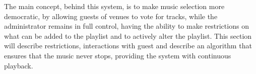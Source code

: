 The main concept, behind this system, is to make music selection more democratic, by allowing guests of venues to vote for tracks, while the administrator remains in full control, having the ability to make restrictions on what can be added to the playlist and to actively alter the playlist. This section will describe restrictions, interactions with guest and describe an algorithm that ensures that the music never stops, providing the system with continuous playback.